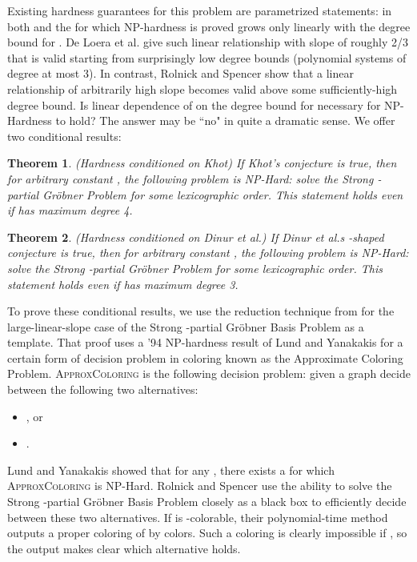\documentclass{article}
\newtheorem{theorem}{Theorem}[]
\begin{document}
Existing hardness guarantees for this problem are parametrized statements: in both \citep{deloera} and \citep{RS} the  for which NP-hardness is proved grows only linearly with the degree bound for . De Loera et al. give such linear relationship with slope of roughly 2/3 that is valid starting from surprisingly low degree bounds (polynomial systems of degree at most 3). In contrast, Rolnick and Spencer show that a linear relationship of arbitrarily high slope becomes valid above some sufficiently-high degree bound. Is linear dependence of  on the degree bound for  necessary for NP-Hardness to hold? The answer may be ``no" in quite a dramatic sense. We offer two conditional results:

\begin{theorem} \label{Khotcond}(Hardness conditioned on Khot)
If Khot's  conjecture is true, then for arbitrary constant , the following problem is NP-Hard:
solve the Strong -partial Gr\"{o}bner Problem for some lexicographic order.
This statement holds even if  has maximum degree 4.
\end{theorem}

\begin{theorem} \label{Dinurcond}(Hardness conditioned on Dinur et al.)
If Dinur et al.s -shaped conjecture is true, then for arbitrary constant , the following problem is NP-Hard:
solve the Strong -partial Gr\"{o}bner Problem for some lexicographic order.
This statement holds even if  has maximum degree 3.
\end{theorem}

To prove these conditional results, we use the reduction technique from \citep{RS} for the large-linear-slope case of the Strong -partial Gr\"{o}bner Basis Problem as a template. That proof uses a '94 NP-hardness result of Lund and Yanakakis \citep{Lundyan} for a certain form of decision problem in coloring known as the Approximate Coloring Problem. 
\textsc{ApproxColoring} is the following decision problem: given a graph  decide between the following two alternatives:
\begin{itemize}
\item  , or
\item .
\end{itemize}

Lund and Yanakakis showed that for any , there exists a  for which \textsc{ApproxColoring} is NP-Hard.  Rolnick and Spencer use the ability to solve the Strong -partial Gr\"{o}bner Basis Problem closely as a black box to efficiently decide between these two alternatives. If  is -colorable, their polynomial-time method outputs a proper coloring of  by  colors. Such a coloring is clearly impossible if , so the output makes clear which alternative holds.
\end{document}
